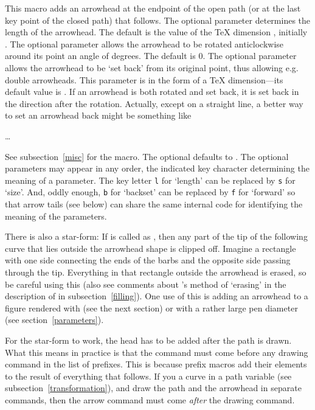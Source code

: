 \documentclass[letterpaper]{article}
\begin{document}
This macro adds an arrowhead at the endpoint of the open path (or at the
last key point of the closed path) that follows. The optional parameter
 determines the length of the arrowhead.  The default is
the value of the \TeX{} dimension , initially \dim{3pt}. The
optional parameter  allows the arrowhead to be rotated
anticlockwise around its point an angle of  degrees. The
default is 0. The optional parameter  allows the arrowhead
to be `set back' from its original point, thus allowing e.g. double
arrowheads. This parameter is in the form of a \TeX{} dimension---its
default value is \dim{0pt}. If an arrowhead is both rotated and set
back, it is set back in the direction after the rotation. Actually,
except on a straight line, a better way to set an arrowhead back might
be something like
\begin{ex}
  \dots
\end{ex}
See subsection~\ref{misc} for the  macro. The optional
 defaults to . The optional parameters may
appear in any order, the indicated key character determining the meaning
of a parameter. The key letter \texttt{l} for `length' can be replaced
by \texttt{s} for `size'. And, oddly enough, \texttt{b} for `backset'
can be replaced by \texttt{f} for `forward' so that arrow tails (see
below) can share the same internal code for identifying the meaning of
the parameters.

There is also a star-form: If  is called as , then
any part of the tip of the following curve that lies outside the
arrowhead shape is clipped off. Imagine a rectangle with one side
connecting the ends of the barbs and the opposite  side passing through
the tip. Everything in that rectangle outside the arrowhead is erased,
so be careful using this (also see comments about \MP{}'s method of
`erasing' in the description of  in
\cs{}subsection~\ref{filling}). One use of this is adding an arrowhead
to a figure rendered with  (see the next section) or with
a rather large pen diameter (see section~\ref{parameters}).

For the star-form to work, the head has to be added after the path is
drawn. What this means in practice is that the  command must
come before any drawing command in the list of prefixes. This is because
prefix macros add their elements to the result of everything that
follows. If you  a curve in a path variable (see
subsection~\ref{transformation}), and draw the path and the arrowhead in
separate commands, then the arrow command must come \emph{after} the
drawing command.
\end{document}
